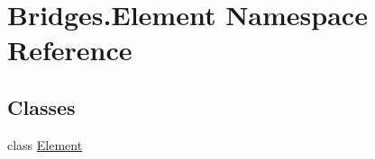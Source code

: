 \hypertarget{namespace_bridges_1_1_element}{}\section{Bridges.\+Element Namespace Reference}
\label{namespace_bridges_1_1_element}
\subsection*{Classes}
\begin{DoxyCompactItemize}
\item 
class \mbox{\hyperlink{class_bridges_1_1_element_1_1_element}{Element}}
\end{DoxyCompactItemize}
